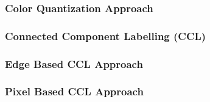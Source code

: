 \documentclass[12pt]{article}
\begin{document}
    \subsubsection{Color Quantization Approach}\label{subsubsec:color-quantization-approach}



    \subsubsection{Connected Component Labelling (CCL)}\label{subsubsec:connected-component-labelling-(ccl)}



    \subsubsection{Edge Based CCL Approach}\label{subsubsec:edge-based-ccl-approach}



    \subsubsection{Pixel Based CCL Approach}\label{subsubsec:pixel-based-ccl-approach}


\end{document}
